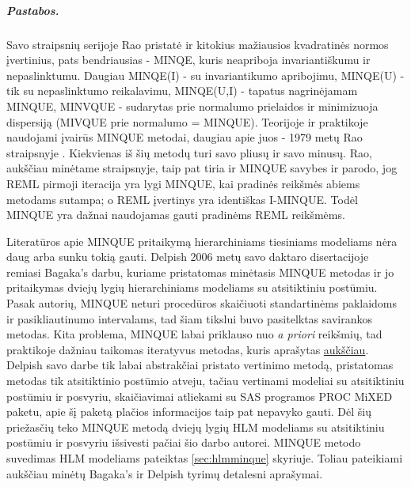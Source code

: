 \documentclass[11pt,a4paper]{article}
\begin{document}
\subparagraph{Pastabos.} Savo straipsnių serijoje Rao pristatė ir kitokius mažiausios kvadratinės normos įvertinius, pats bendriausias - MINQE, kuris neapriboja invariantiškumu ir nepaslinktumu. Daugiau MINQE(I) - su invariantikumo apribojimu, MINQE(U) - tik su nepaslinktumo reikalavimu, MINQE(U,I) - tapatus nagrinėjamam MINQUE, MINVQUE - sudarytas prie normalumo prielaidos ir minimizuoja dispersiją (MIVQUE prie normalumo = MINQUE). Teorijoje ir praktikoje naudojami įvairūs MINQUE metodai, daugiau apie juos - 1979 metų Rao straipsnyje \cite{minquereml3}. Kiekvienas iš šių metodų turi savo pliusų ir savo minusų. Rao, aukščiau minėtame straipsnyje, taip pat tiria ir MINQUE savybes ir parodo, jog REML pirmoji iteracija yra lygi MINQUE, kai pradinės reikšmės abiems metodams sutampa; o REML įvertinys yra identiškas I-MINQUE. Todėl MINQUE yra dažnai naudojamas gauti pradinėms REML reikšmėms.

\indent Literatūros apie MINQUE pritaikymą hierarchiniams tiesiniams modeliams nėra daug arba sunku tokią gauti. Delpish\cite{delpish} 2006 metų savo daktaro disertacijoje remiasi Bagaka's\cite{bagaka} darbu, kuriame pristatomas minėtasis MINQUE metodas ir jo pritaikymas dviejų lygių hierarchiniams modeliams su atsitiktiniu postūmiu. Pasak autorių, MINQUE neturi procedūros skaičiuoti standartinėms paklaidoms ir pasikliautinumo intervalams, tad šiam tikslui buvo pasitelktas savirankos metodas. Kita problema, MINQUE labai priklauso nuo \textit{a priori} reikšmių, tad praktikoje dažniau taikomas iteratyvus metodas, kuris aprašytas \hyperlink{iminque}{aukščiau}. Delpish savo darbe tik labai abstrakčiai pristato vertinimo metodą, pristatomas metodas tik atsitiktinio postūmio atveju, tačiau vertinami modeliai su atsitiktiniu postūmiu ir posvyriu, skaičiavimai atliekami su SAS programos PROC MiXED paketu, apie šį paketą plačios informacijos taip pat nepavyko gauti. Dėl šių priežasčių teko MINQUE metodą dviejų lygių HLM modeliams su atsitiktiniu postūmiu ir posvyriu išsivesti pačiai šio darbo autorei. MINQUE metodo suvedimas HLM modeliams pateiktas \ref{sec:hlmminque} skyriuje. Toliau pateikiami aukščiau minėtų Bagaka's ir Delpish tyrimų detalesni aprašymai.
\end{document}
